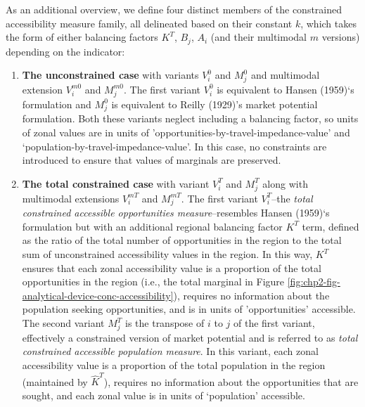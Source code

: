\documentclass[
11pt, %
oneside, %
english, %
singlespacing, %
]{macthesis} %
\begin{document}
As an additional overview, we define four distinct members of the constrained accessibility measure family, all delineated based on their constant \(k\), which takes the form of either balancing factors \(K^T\), \(B_j\), \(A_i\) (and their multimodal \(m\) versions) depending on the indicator:

\begin{enumerate}
\def\labelenumi{\arabic{enumi}.}
\item
  \textbf{The unconstrained case} with variants \(V_i^0\) and \(M_j^0\) and multimodal extension \(V_i^{m0}\) and \(M_j^{m0}\). The first variant \(V_i^0\) is equivalent to Hansen (1959)`s formulation and \(M_j^0\) is equivalent to Reilly (1929)'s market potential formulation. Both these variants neglect including a balancing factor, so units of zonal values are in units of 'opportunities-by-travel-impedance-value' and `population-by-travel-impedance-value'. In this case, no constraints are introduced to ensure that values of marginals are preserved.
\item
  \textbf{The total constrained case} with variant \(V_i^T\) and \(M_j^T\) along with multimodal extensions \(V_i^{mT}\) and \(M_j^{mT}\). The first variant \(V_i^T\)--the \emph{total constrained accessible opportunities measure}--resembles Hansen (1959)`s formulation but with an additional regional balancing factor \(K^T\) term, defined as the ratio of the total number of opportunities in the region to the total sum of unconstrained accessibility values in the region. In this way, \(K^T\) ensures that each zonal accessibility value is a proportion of the total opportunities in the region (i.e., the total marginal in Figure \ref{fig:chp2-fig-analytical-device-conc-accessibility}), requires no information about the population seeking opportunities, and is in units of 'opportunities' accessible. The second variant \(M_j^T\) is the transpose of \(i\) to \(j\) of the first variant, effectively a constrained version of market potential and is referred to as \emph{total constrained accessible population measure}. In this variant, each zonal accessibility value is a proportion of the total population in the region (maintained by \(\hat K^T\)), requires no information about the opportunities that are sought, and each zonal value is in units of `population' accessible.
\end{enumerate}
\end{document}
